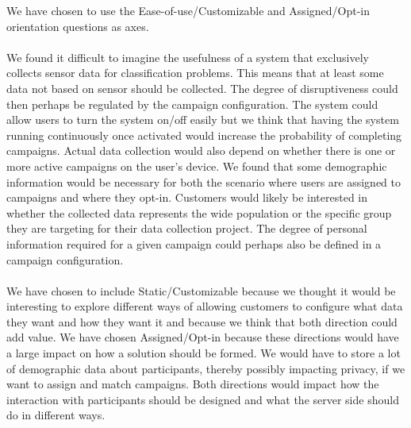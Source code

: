 We have chosen to use the Ease-of-use/Customizable and Assigned/Opt-in orientation questions as axes. 
\\\\
We found it difficult to imagine the usefulness of a system that exclusively collects sensor data for classification problems. This means that at least some data not based on sensor should be collected. The degree of disruptiveness could then perhaps be regulated by the campaign configuration. 
The system could allow users to turn the system on/off easily but we think that having the system running continuously once activated would increase the probability of completing campaigns. Actual data collection would also depend on whether there is one or more active campaigns on the user's device.
We found that some demographic information would be necessary for both the scenario where users are assigned to campaigns and where they opt-in. Customers would likely be interested in whether the collected data represents the wide population or the specific group they are targeting for their data collection project. The degree of personal information required for a given campaign could perhaps also be defined in a campaign configuration. 
\\\\
We have chosen to include Static/Customizable because we thought it would be interesting to explore different ways of allowing customers to configure what data they want and how they want it and because we think that both direction could add value. We have chosen Assigned/Opt-in because these directions would have a large impact on how a solution should be formed. We would have to store a lot of demographic data about participants, thereby possibly impacting privacy, if we want to assign and match campaigns. Both directions would impact how the interaction with participants should be designed and what the server side should do in different ways.






